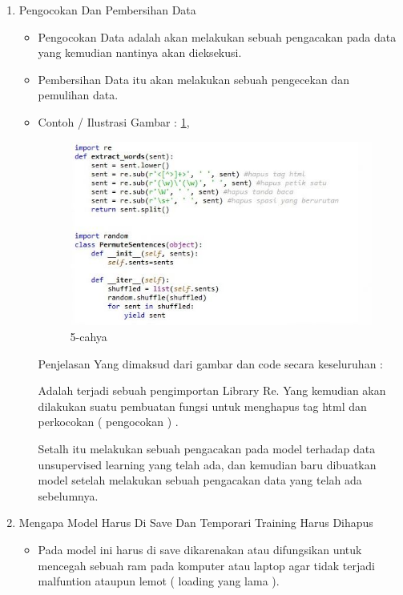 \begin{enumerate}
\begin{itemize}
\par
\end{itemize}
\item Pengocokan Dan Pembersihan Data
\begin{itemize}
\item Pengocokan Data adalah akan melakukan sebuah pengacakan pada data yang kemudian nantinya akan dieksekusi. 
\item Pembersihan Data itu akan  melakukan sebuah pengecekan dan pemulihan data.
\item Contoh / Ilustrasi Gambar : \ref{5-cahya}, 
\par
\begin{figure}[!hbtp]
\centering
\includegraphics[scale=0.3]{figures/5-cahya.jpg}
\caption{5-cahya}
\label{5-cahya}
\end{figure}
\par
\par Penjelasan Yang dimaksud dari gambar dan code secara keseluruhan : 
\par Adalah terjadi sebuah pengimportan Library Re. Yang kemudian akan  dilakukan suatu pembuatan fungsi untuk menghapus tag html dan perkocokan ( pengocokan ) .
\par Setalh itu melakukan sebuah pengacakan pada model terhadap data unsupervised learning yang telah ada, dan kemudian baru dibuatkan model setelah melakukan sebuah pengacakan data yang telah ada sebelumnya.
\par
\end{itemize}
\item Mengapa Model Harus Di Save Dan Temporari Training Harus Dihapus
\begin{itemize}
\item Pada model ini harus di save dikarenakan atau difungsikan untuk mencegah sebuah ram pada komputer atau laptop agar tidak terjadi malfuntion ataupun lemot ( loading yang lama ). 

\end{itemize}
\end{enumerate}
